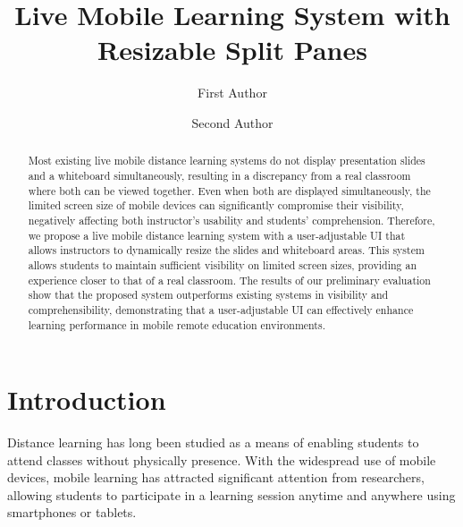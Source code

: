 \documentclass[runningheads]{llncs}
\begin{document}
%
\title{Live Mobile Learning System with Resizable Split Panes}
%
%
\author{First Author \and
Second Author}
%
%
%
%
\maketitle              %
%
\begin{abstract}
Most existing live mobile distance learning systems do not display presentation slides and a whiteboard simultaneously, resulting in a discrepancy from a real classroom where both can be viewed together. Even when both are displayed simultaneously, the limited screen size of mobile devices can significantly compromise their visibility, negatively affecting both instructor's usability and students' comprehension. Therefore, we propose a live mobile distance learning system with a user-adjustable UI that allows instructors to dynamically resize the slides and whiteboard areas. This system allows students to maintain sufficient visibility on limited screen sizes, providing an experience closer to that of a real classroom. The results of our preliminary evaluation show that the proposed system outperforms existing systems in visibility and comprehensibility, demonstrating that a user-adjustable UI can effectively enhance learning performance in mobile remote education environments.

\end{abstract}
%
%
%
\section{Introduction}
Distance learning has long been studied as a means of enabling students to attend classes without physically presence. With the widespread use of mobile devices, mobile learning has attracted significant attention from researchers, allowing students to participate in a learning session anytime and anywhere using smartphones or tablets\cite{10.1145/1414558.1414568}.
\end{document}
